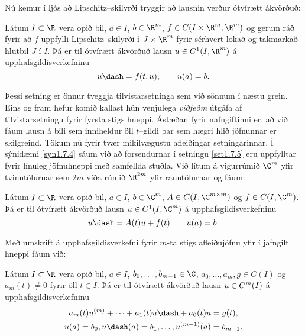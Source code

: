 Nú kemur í ljós að Lipschitz--skilyrði tryggir að lausnin verður
ótvírætt ákvörð\-uð:

\begin{se}\label{set1.7.5}{}
Látum $I\subset \R$ vera opið bil, $a\in I$, $b\in \R\sp m$,
$f\in C(I\times \R\sp m,\R\sp m)$ og gerum ráð fyrir að $f$ uppfylli
Lipschitz--skilyrði í $J\times \R\sp m$ fyrir sérhvert lokað og
takmarkað hlutbil $J$ í $I$. Þá er til ótvírætt ákvörðuð lausn 
$u\in C\sp 1(I,\R\sp m)$ á upphafsgildisverkefninu
 $$u\dash=f(t,u), \qquad u(a)=b.
 $$
\end{se}

Þessi setning er önnur tveggja tilvistarsetninga sem við sönnum í
næstu grein.  Eins og fram hefur komið kallast hún
venjulega {\it víðfeðm} útgáfa af tilvistarsetningu fyrir
fyrsta stigs hneppi. Ástæðan fyrir nafngiftinni er, að við fáum
lausn á bili sem inniheldur öll $t$--gildi þar sem hægri hlið
jöfnunnar er skilgreind.
Tökum nú fyrir 
tvær mikilvægustu afleiðingar setningarinnar.  Í sýnidæmi
\ref{syn1.7.4}
sáum við að forsendurnar í setningu \ref{set1.7.5} eru uppfylltar fyrir línuleg
jöfnuhneppi með samfellda stuðla.  Við lítum á vigurrúmið $\C^m$ yfir
tvinntölurnar sem $2m$ víða rúmið $\R^{2m}$ yfir rauntölurnar og fáum: 

\begin{fs}
Látum $I\subset \R$ vera opið bil, $a\in I$, $b\in \C\sp m$,
$A\in C(I,\C\sp{m\times m})$ og $f\in C(I,\C\sp m)$. Þá er til
ótvírætt ákvörðuð lausn  
$u\in C\sp 1(I,\C\sp m)$ á upphafsgildisverkefninu
 \begin{equation*}u\dash=A(t)u+f(t) \qquad u(a)=b.\label{1.7.3}
 \end{equation*}
\end{fs}

Með umskrift á upphafsgildisverkefni fyrir $m$-ta stigs afleiðujöfnu
yfir í jafngilt hneppi fáum við:

\begin{fs}
Látum $I\subset \R$ vera opið bil, $a\in I$,
$b_0,\dots,b_{m-1} \in \C$, $a_0,\dots,a_m, g\in C(I)$ og $a_m(t)\neq 0$
fyrir öll $t\in I$.
Þá er til ótvírætt ákvörðuð lausn  
$u\in C\sp m(I)$ á upphafsgildisverkefninu
\begin{gather*}
a_m(t)u\sp {(m)}+\cdots+a_1(t)u\dash+a_0(t)u=g(t),\\
u(a)=b_0, u\dash(a)=b_1,\dots, u\sp{(m-1)}(a)=b_{m-1}.
\end{gather*}
\end{fs}

